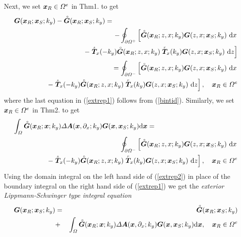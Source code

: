 Next, we set ${\mbox{\boldmath$\mit x$\unboldmath}}_{R}\in {\mit \Omega}^{e}$ in Thm1. to get
\begin{eqnarray} \label{extrep1}
\lefteqn{
{{\bmi G}}({\bmi x}_{R};{\bmi x}_{S};k_y)
-{\rf{\bmi G}}({\bmi x}_{R};{\bmi x}_{S};k_y)=
}\\
&&
\qquad\qquad
-\oint_{\partial {\mit \Omega}^{+}} \left[ {\rf{\bmi G}}({\bmi x}_{R};{z, x};k_y) 
{{\bmi G}}({z, x};{\bmi x}_{S};k_y) \  {\rm d}x \right.\nonumber\\
&&
\qquad\qquad\qquad\qquad
- \left.\stackrel{\scriptscriptstyle _s}{\bmi T}{}_{\!\!\! x}(-k_y){\rf{\bmi 
G}}({\bmi x}_{R};{z, x};k_y)  
\stackrel{\scriptscriptstyle _r}{\bmi T}{}_{\!\!\! x}(k_y){{\bmi G}}({z, 
x};{\bmi x}_{S};k_y) \ {\rm d}z \right]\nonumber\\
&&
\qquad\qquad
=\oint_{\partial {\mit \Omega}^{-}} \left[ {\rf{\bmi G}}({\bmi x}_{R};{z, x};k_y) 
{{\bmi G}}({z, x};{\bmi x}_{S};k_y) \  {\rm d}x \right.\nonumber\\
&&
\qquad\qquad
- \left.\stackrel{\scriptscriptstyle _s}{\bmi T}{}_{\!\!\! x}(-k_y){\rf{\bmi 
G}}({\bmi x}_{R};{z, x};k_y)  
\stackrel{\scriptscriptstyle _r}{\bmi T}{}_{\!\!\! x}(k_y){{\bmi G}}({z, 
x};{\bmi x}_{S};k_y) \ {\rm d}z \right], \quad {\bmi x}_{R}\in {\mit \Omega}^{e}\nonumber
\end{eqnarray}
where the last equation in (\ref{extrep1}) follows from (\ref{bintid}). 
Similarly,  we set ${\mbox{\boldmath$\mit x$\unboldmath}}_{R}\in {\mit \Omega}^{e}$ in Thm2. to get
\begin{eqnarray} \label{extrep2}
\lefteqn{\int_{{\mit \Omega}} {\rf{\bmi G}}({\bmi x}_{R};{\bmi x};k_y)
{\mit \Delta} {\bmi A}({\bmi
x},\partial_{x};k_y) {\bmi G}({\bmi x},{\bmi x}_{S};k_y) {\rm d}{\bmi x}=}\\
&&
\oint_{\partial {\mit \Omega}^{-}} \left[ {\rf{\bmi G}}({\bmi x}_{R};{z, x};k_y) 
{{\bmi G}}({z, x};{\bmi x}_{S};k_y) \  {\rm d}x \right.\nonumber\\
&&
\qquad\qquad
- \left.\stackrel{\scriptscriptstyle _s}{\bmi T}{}_{\!\!\! x}(-k_y){\rf{\bmi 
G}}({\bmi x}_{R};{z, x};k_y)  
\stackrel{\scriptscriptstyle _r}{\bmi T}{}_{\!\!\! x}(k_y){{\bmi G}}({z, 
x};{\bmi x}_{S};k_y) \ {\rm d}z \right], \quad {\bmi x}_{R}\in {\mit \Omega}^{e}\nonumber
\end{eqnarray}
Using the domain integral on the left hand side of (\ref{extrep2}) in 
place of the boundary integral on the right hand side of (\ref{extrep1}) 
we get the {\em exterior Lippmann-Schwinger type integral equation\/}
\begin{eqnarray} \label{LSexterior}
{{\mbox{\boldmath$\mit G$\unboldmath}}}({\mbox{\boldmath$\mit x$\unboldmath}}_{R};{\mbox{\boldmath$\mit x$\unboldmath}}_{S};k_y)&=&
{\stackrel{\scriptscriptstyle _{\,\,\circ}}{ \mbox{\boldmath$\mit G$\unboldmath}}}({\mbox{\boldmath$\mit x$\unboldmath}}_{R};{\mbox{\boldmath$\mit x$\unboldmath}}_{S};k_y)\nonumber\\
&+&\int_{{\mit \Omega}} {\stackrel{\scriptscriptstyle _{\,\,\circ}}{ \mbox{\boldmath$\mit G$\unboldmath}}}({\mbox{\boldmath$\mit x$\unboldmath}}_{R};{\mbox{\boldmath$\mit x$\unboldmath}};k_y)
{\mit \Delta} {\mbox{\boldmath$\mit A$\unboldmath}}({\mbox{\boldmath$\mit x$\unboldmath}},\partial_{x};k_y) {\mbox{\boldmath$\mit G$\unboldmath}}({\mbox{\boldmath$\mit x$\unboldmath}},{\mbox{\boldmath$\mit x$\unboldmath}}_{S};k_y) {\rm d}{\mbox{\boldmath$\mit x$\unboldmath}},
\quad {\mbox{\boldmath$\mit x$\unboldmath}}_{R}\in {\mit \Omega}^{e}
\end{eqnarray}


